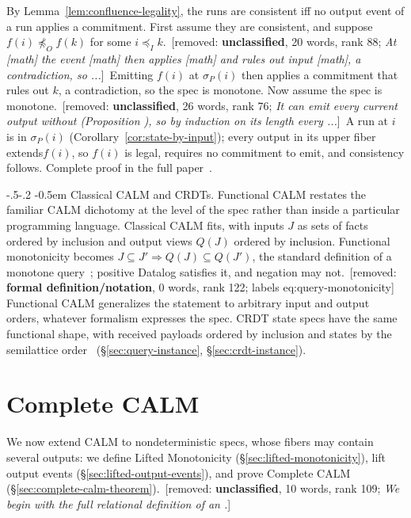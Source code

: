 \documentclass[sigconf]{cidr-2027}
\makeatletter
\theoremstyle{remark}
\renewcommand\paragraph{\@startsection{paragraph}{4}{\z@}%
  {-.5\baselineskip \@plus -2\p@ \@minus -.2\p@}%
  {-0.5em}%
  {\normalfont\bfseries}}
\newcommand{\InputOrd}{\preceq_I}
\newcommand{\OutputOrd}{\preceq_O}
\newcommand{\commitment}{commitment\xspace}
\newcommand{\outrel}{extends\xspace}          %
\newcommand{\fullproof}{Complete proof in the full paper~\cite{hellerstein2026completecalmfull}.}
\renewenvironment{proof}[1][\proofname]{\par
  \pushQED{\qed}\normalfont\topsep2\p@\relax
  \trivlist\item[\@proofindent\hskip\labelsep{\@proofnamefont #1\@addpunct{.}}]\ignorespaces
}{\popQED\endtrivlist\@endpefalse}
\newcommand{\removednote}[1]{{\color{cutred}\footnotesize\,[removed: #1]\,}}
\makeatother
\begin{document}
\begin{proof}[Proof sketch]
\textcolor{newblue}{By Lemma~\ref{lem:confluence-legality}, the runs are consistent iff
no output event of a run applies a \commitment.} First assume they are
consistent, and suppose $f(i)\not\OutputOrd f(k)$ for some $i\InputOrd k$. \removednote{\textbf{unclassified}, 20 words, rank 88; \textit{At [math] the event [math] then applies [math] and rules out input [math], a contradiction, so ...}} \textcolor{newblue}{Emitting $f(i)$ at $\sigma_P(i)$ then applies a \commitment that rules out $k$,
a contradiction, so the spec is monotone.} Now assume the spec is monotone. \removednote{\textbf{unclassified}, 26 words, rank 76; \textit{It can emit every current output without (Proposition ), so by induction on its length every ...}} \textcolor{newblue}{A
run at $i$ is in $\sigma_P(i)$ (Corollary~\ref{cor:state-by-input}); every
output in its upper fiber \outrel $f(i)$, so $f(i)$ is legal, requires no \commitment
to emit, and consistency follows.} \textcolor{newblue}{\fullproof}
\end{proof}

\paragraph{Classical CALM and CRDTs.}
Functional CALM restates the familiar CALM dichotomy at the level of the spec
rather than inside a particular programming language. Classical CALM fits, with inputs $J$ as sets of facts ordered by
inclusion and output views $Q(J)$ ordered by inclusion. \textcolor{newblue}{Functional
monotonicity becomes $J\subseteq J'\Rightarrow Q(J)\subseteq Q(J')$,
the standard definition of a monotone query~\cite{abiteboul1995foundations};
positive Datalog satisfies it, and negation may not.} \removednote{\textbf{formal definition/notation}, 0 words, rank 122; labels eq:query-monotonicity} Functional CALM
generalizes the statement to arbitrary input and
output orders, whatever formalism expresses the spec. \textcolor{newblue}{CRDT state specs have the same functional shape,
with received payloads ordered by inclusion and states by the semilattice
order~\cite{shapiro2011crdt} (\S\ref{sec:query-instance},
\S\ref{sec:crdt-instance}).}


\section{Complete CALM}
\label{sec:complete-calm}

\textcolor{newblue}{We now extend CALM to nondeterministic specs, whose fibers may contain several outputs: we define Lifted Monotonicity (\S\ref{sec:lifted-monotonicity}), lift output events (\S\ref{sec:lifted-output-events}), and prove Complete CALM (\S\ref{sec:complete-calm-theorem}).} \removednote{\textbf{unclassified}, 10 words, rank 109; \textit{We begin with the full relational definition of an .}}
\end{document}
